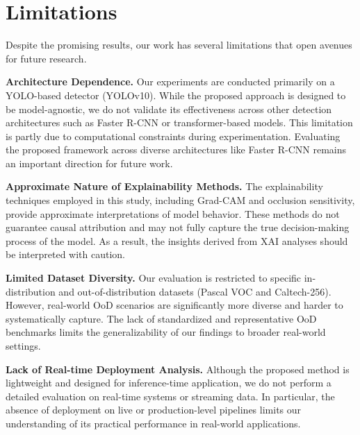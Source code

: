 \section{Limitations}

Despite the promising results, our work has several limitations that open avenues for future research.

\noindent \textbf{Architecture Dependence.}
Our experiments are conducted primarily on a YOLO-based detector (YOLOv10). While the proposed approach is designed to be model-agnostic, we do not validate its effectiveness across other detection architectures such as Faster R-CNN or transformer-based models. This limitation is partly due to computational constraints during experimentation. Evaluating the proposed framework across diverse architectures like Faster R-CNN remains an important direction for future work.

\noindent \textbf{Approximate Nature of Explainability Methods.}
The explainability techniques employed in this study, including Grad-CAM and occlusion sensitivity, provide approximate interpretations of model behavior. These methods do not guarantee causal attribution and may not fully capture the true decision-making process of the model. As a result, the insights derived from XAI analyses should be interpreted with caution.

\noindent \textbf{Limited Dataset Diversity.}
Our evaluation is restricted to specific in-distribution and out-of-distribution datasets (Pascal VOC and Caltech-256). However, real-world OoD scenarios are significantly more diverse and harder to systematically capture. The lack of standardized and representative OoD benchmarks limits the generalizability of our findings to broader real-world settings.

\noindent \textbf{Lack of Real-time Deployment Analysis.}
Although the proposed method is lightweight and designed for inference-time application, we do not perform a detailed evaluation on real-time systems or streaming data. In particular, the absence of deployment on live or production-level pipelines limits our understanding of its practical performance in real-world applications.